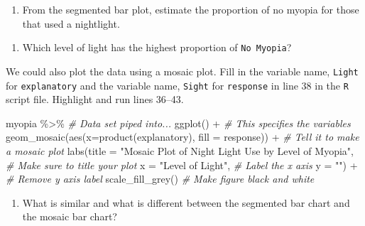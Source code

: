 \documentclass[
]{report}
\newenvironment{Shaded}{\begin{snugshade}}{\end{snugshade}}
\newcommand{\AttributeTok}[1]{\textcolor[rgb]{0.77,0.63,0.00}{#1}}
\newcommand{\CommentTok}[1]{\textcolor[rgb]{0.56,0.35,0.01}{\textit{#1}}}
\newcommand{\FunctionTok}[1]{\textcolor[rgb]{0.00,0.00,0.00}{#1}}
\newcommand{\NormalTok}[1]{#1}
\newcommand{\SpecialCharTok}[1]{\textcolor[rgb]{0.00,0.00,0.00}{#1}}
\newcommand{\StringTok}[1]{\textcolor[rgb]{0.31,0.60,0.02}{#1}}
\providecommand{\tightlist}{%
  \setlength{\itemsep}{0pt}\setlength{\parskip}{0pt}}
\begin{document}
\vspace{2in}

\begin{enumerate}
\def\labelenumi{\arabic{enumi}.}
\setcounter{enumi}{5}
\tightlist
\item
  From the segmented bar plot, estimate the proportion of no myopia for those that used a nightlight.
\end{enumerate}

\vspace{0.5in}

\begin{enumerate}
\def\labelenumi{\arabic{enumi}.}
\setcounter{enumi}{6}
\tightlist
\item
  Which level of light has the highest proportion of \texttt{No\ Myopia}?
\end{enumerate}

\vspace{0.5in}

We could also plot the data using a mosaic plot. Fill in the variable name, \texttt{Light} for \texttt{explanatory} and the variable name, \texttt{Sight} for \texttt{response} in line 38 in the \texttt{R} script file. Highlight and run lines 36--43.

\begin{Shaded}
\begin{Highlighting}[]
\NormalTok{myopia }\SpecialCharTok{\%\textgreater{}\%} \CommentTok{\# Data set piped into...}
  \FunctionTok{ggplot}\NormalTok{() }\SpecialCharTok{+}   \CommentTok{\# This specifies the variables}
  \FunctionTok{geom\_mosaic}\NormalTok{(}\FunctionTok{aes}\NormalTok{(}\AttributeTok{x=}\FunctionTok{product}\NormalTok{(explanatory), }\AttributeTok{fill =}\NormalTok{ response)) }\SpecialCharTok{+}  \CommentTok{\# Tell it to make a mosaic plot}
  \FunctionTok{labs}\NormalTok{(}\AttributeTok{title =} \StringTok{"Mosaic Plot of Night Light Use by Level of Myopia"}\NormalTok{,  }
       \CommentTok{\# Make sure to title your plot }
       \AttributeTok{x =} \StringTok{"Level of Light"}\NormalTok{,   }\CommentTok{\# Label the x axis}
       \AttributeTok{y =} \StringTok{""}\NormalTok{) }\SpecialCharTok{+}  \CommentTok{\# Remove y axis label}
      \FunctionTok{scale\_fill\_grey}\NormalTok{()  }\CommentTok{\# Make figure black and white}
\end{Highlighting}
\end{Shaded}

\begin{enumerate}
\def\labelenumi{\arabic{enumi}.}
\setcounter{enumi}{7}
\tightlist
\item
  What is similar and what is different between the segmented bar chart and the mosaic bar chart?
\end{enumerate}
\end{document}

